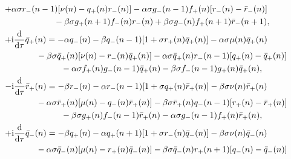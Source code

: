 \documentclass[pdftex]{sigma}
\numberwithin{equation}{section}
\begin{document}
\begin{gather}
	 +\alpha\sigma r_{-}(n-1)[\nu(n)-q_{+}(n)r_{-}(n)] - \alpha\sigma g_{-}(n-1)f_{+}(n)[r_{-}(n)-\bar{r}_{-}(n)]\nonumber\\
 \hspace{0.25mm}\hphantom{-\mathrm{i}\frac{\mathrm{d}}{\mathrm{d}\tau}r_{-}(n) =}{}
	 -\beta\sigma g_{+}(n+1)f_{-}(n)r_{-}(n) +\beta\sigma g_{-}(n)f_{+}(n+1)\bar{r}_{-}(n+1), \label{eq-6.4}
\\
	 +\mathrm{i}\frac{\mathrm{d}}{\mathrm{d}\tau}\bar{q}_{+}(n) = -\alpha q_{-}(n) - \beta q_{-}(n-1)[1+\sigma r_{+}(n)\bar{q}_{+}(n)] - \alpha\sigma\mu(n)\bar{q}_{+}(n)\nonumber\\
 \hspace{0.25mm}\hphantom{+\mathrm{i}\frac{\mathrm{d}}{\mathrm{d}\tau}\bar{q}_{+}(n) =}{}
	 -\beta\sigma \bar{q}_{+}(n)[\nu(n)-r_{-}(n)\bar{q}_{+}(n)] - \alpha\sigma \bar{q}_{+}(n)r_{-}(n-1)[q_{+}(n)-\bar{q}_{+}(n)]\nonumber\\
 \hspace{0.25mm}\hphantom{+\mathrm{i}\frac{\mathrm{d}}{\mathrm{d}\tau}\bar{q}_{+}(n) =}{}
	 -\alpha\sigma f_{+}(n)g_{-}(n-1)\bar{q}_{+}(n) -\beta\sigma f_{-}(n-1)g_{+}(n)\bar{q}_{+}(n), \label{eq-6.5}
\\
	 -\mathrm{i}\frac{\mathrm{d}}{\mathrm{d}\tau}\bar{r}_{+}(n) = -\beta r_{-}(n) - \alpha r_{-}(n-1)[1+\sigma q_{+}(n)\bar{r}_{+}(n)] - \beta\sigma\nu(n)\bar{r}_{+}(n)\nonumber\\
 \hspace{0.25mm}\hphantom{-\mathrm{i}\frac{\mathrm{d}}{\mathrm{d}\tau}\bar{r}_{+}(n) =}{}
	 -\alpha\sigma \bar{r}_{+}(n)[\mu(n)-q_{-}(n)\bar{r}_{+}(n)] - \beta\sigma \bar{r}_{+}(n)q_{-}(n-1)[r_{+}(n)-\bar{r}_{+}(n)]\nonumber\\
 \hspace{0.25mm}\hphantom{-\mathrm{i}\frac{\mathrm{d}}{\mathrm{d}\tau}\bar{r}_{+}(n) =}{}
	 -\beta\sigma g_{+}(n)f_{-}(n-1)\bar{r}_{+}(n) -\alpha\sigma g_{-}(n-1)f_{+}(n)\bar{r}_{+}(n), \label{eq-6.6}
\\
	 +\mathrm{i}\frac{\mathrm{d}}{\mathrm{d}\tau}\bar{q}_{-}(n) = -\beta q_{+}(n) - \alpha q_{+}(n+1)[1+\sigma r_{-}(n)\bar{q}_{-}(n)] - \beta\sigma\nu(n)\bar{q}_{-}(n)\nonumber\\
 \hspace{0.25mm}\hphantom{+\mathrm{i}\frac{\mathrm{d}}{\mathrm{d}\tau}\bar{q}_{-}(n) =}{}
	 -\alpha\sigma \bar{q}_{-}(n)[\mu(n)-r_{+}(n)\bar{q}_{-}(n)] - \beta\sigma \bar{q}_{-}(n)r_{+}(n+1)[q_{-}(n)-\bar{q}_{-}(n)]\nonumber\\
 \hspace{0.25mm}\hphantom{+\mathrm{i}\frac{\mathrm{d}}{\mathrm{d}\tau}\bar{q}_{-}(n) =}{}

\end{gather}
\end{document}
